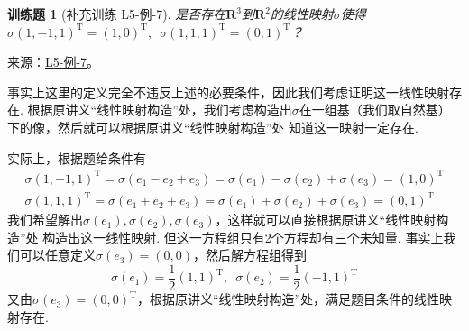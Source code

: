 \documentclass[12pt,fontset=fandol]{ctexart}
\newtheorem{exercise}{训练题}[section]
\begin{document}
\begin{exercise}[补充训练 L5-例-7]\label{prob:L5-例-7}
是否存在$\mathbf{R}^3$到$\mathbf{R}^2$的线性映射$\sigma$使得$\sigma(1,-1,1)^{\mathrm{T}}=(1,0)^{\mathrm{T}},\enspace\sigma(1,1,1)^{\mathrm{T}}=(0,1)^{\mathrm{T}}$？
\end{exercise}
\noindent 来源：\href{https://github.com/yhwu-is/Linear-Algebra-Left-Undone/blob/new/%E8%AE%B2%E4%B9%89/%E4%B8%93%E9%A2%98/5%20%E7%BA%BF%E6%80%A7%E6%98%A0%E5%B0%84.tex}{L5-例-7}。
\begin{solve}
事实上这里的定义完全不违反上述的必要条件，因此我们考虑证明这一线性映射存在. 根据原讲义“线性映射构造”处，我们考虑构造出$\sigma$在一组基（我们取自然基）下的像，然后就可以根据原讲义“线性映射构造”处 知道这一映射一定存在.

    实际上，根据题给条件有
    \begin{gather*}
        \sigma(1,-1,1)^{\mathrm{T}}
        =\sigma(e_1-e_2+e_3)
        =\sigma(e_1)-\sigma(e_2)+\sigma(e_3)
        =(1,0)^{\mathrm{T}} \\
        \sigma(1,1,1)^{\mathrm{T}}
        =\sigma(e_1+e_2+e_3)
        =\sigma(e_1)+\sigma(e_2)+\sigma(e_3)
        =(0,1)^{\mathrm{T}}
    \end{gather*}
    我们希望解出$\sigma(e_1),\sigma(e_2),\sigma(e_3)$，这样就可以直接根据原讲义“线性映射构造”处 构造出这一线性映射. 但这一方程组只有2个方程却有三个未知量. 事实上我们可以任意定义$\sigma(e_3)=(0,0)$，然后解方程组得到
    \[\sigma(e_1)=\dfrac{1}{2} (1,1)^{\mathrm{T}},\enspace \sigma(e_2)=\dfrac{1}{2} (-1,1)^{\mathrm{T}}\]
    又由$\sigma(e_3)=(0,0)^{\mathrm{T}}$，根据原讲义“线性映射构造”处，满足题目条件的线性映射存在.
\end{solve}
\end{document}
